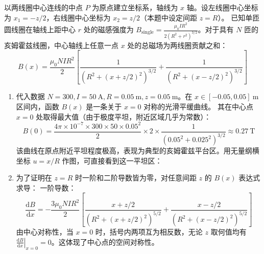 \begin{solution}
以两线圈中心连线的中点 $P$ 为原点建立坐标系，轴线为 $x$ 轴。设左线圈中心坐标为 $x_1 = -z/2$，右线圈中心坐标为 $x_2 = z/2$（本题中设定间距 $z=R$）。
已知单匝圆线圈在轴线上距中心 $r$ 处的磁感强度为 $B_{\text{single}} = \frac{\mu_0 I R^2}{2(R^2 + r^2)^{3/2}}$。对于具有 $N$ 匝的亥姆霍兹线圈，中心轴线上任意一点 $x$ 处的总磁场为两线圈贡献之和：
$$ B(x) = \frac{\mu_0 N I R^2}{2} \left[ \frac{1}{\left(R^2 + (x + z/2)^2\right)^{3/2}} + \frac{1}{\left(R^2 + (x - z/2)^2\right)^{3/2}} \right] $$

\begin{enumerate}
    \item[(a)] 代入数据 $N=300, I=50 \ \mathrm{A}, R=0.05 \ \mathrm{m}, z=0.05 \ \mathrm{m}$。在 $x \in [-0.05, 0.05] \ \mathrm{m}$ 区间内，函数 $B(x)$ 是一条关于 $x=0$ 对称的光滑平缓曲线。
    其在中心点 $x=0$ 处取得最大值（由于极度平坦，附近区域几乎为常数）：
    $$ B(0) = \frac{4\pi \times 10^{-7} \times 300 \times 50 \times 0.05^2}{2} \times 2 \times \frac{1}{(0.05^2 + 0.025^2)^{3/2}} \approx 0.27 \ \mathrm{T} $$
    该曲线在原点附近平坦程度极高，表现为典型的亥姆霍兹平台区。用无量纲横坐标 $u=x/R$ 作图，可直接看到这一平坦区：
    \begin{center}
    \end{center}

    \item[(b)] 为了证明在 $z=R$ 时一阶和二阶导数皆为零，对任意间距 $z$ 的 $B(x)$ 表达式求导：
    一阶导数：
    $$ \frac{\mathrm{d}B}{\mathrm{d}x} = -\frac{3\mu_0 N I R^2}{2} \left[ \frac{x + z/2}{\left(R^2 + (x + z/2)^2\right)^{5/2}} + \frac{x - z/2}{\left(R^2 + (x - z/2)^2\right)^{5/2}} \right] $$
    由中心对称性，当 $x=0$ 时，括号内两项互为相反数，无论 $z$ 取何值均有 $\left. \frac{\mathrm{d}B}{\mathrm{d}x} \right|_{x=0} = 0$。这体现了中心点的空间对称性。


\end{enumerate}
\end{solution}

